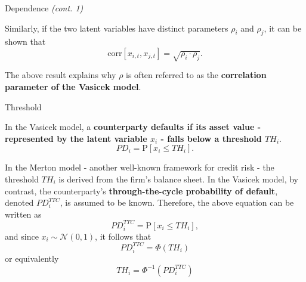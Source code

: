 \documentclass{beamer}
\begin{document}
\begin{frame}{Dependence \textit{(cont. 1)}}
\justifying
\small

Similarly, if the two latent variables have distinct parameters $\rho_i$ and $\rho_j$, it can be shown that
\begin{equation*}
\mathrm{corr}[x_{i,t}, x_{j,t}] = \sqrt{\rho_i \cdot \rho_j}.
\end{equation*}

\medskip

The above result explains why $\rho$ is often referred to as the \textbf{correlation parameter of the Vasicek model}.
\end{frame}

\begin{frame}{Threshold}
\justifying
\small

In the Vasicek model, a \textbf{counterparty defaults if its asset value - represented by the latent variable $x_i$ - falls below a threshold $TH_i$}.
\begin{equation*}
PD_i = \mathrm{P}[x_i \le TH_i].
\end{equation*}

\medskip

In the Merton model - another well-known framework for credit risk - the threshold $TH_i$ is derived from the firm's balance sheet. 
In the Vasicek model, by contrast, the counterparty's \textbf{through-the-cycle probability of default}, denoted $PD_i^{TTC}$, is assumed to be known. Therefore, the above equation can be written as
\begin{equation}
PD_i^{TTC} = \mathrm{P}[x_i \le TH_i],
\end{equation}
and since $x_i \sim \mathcal{N}(0,1)$, it follows that
\begin{equation*}
PD_i^{TTC} = \Phi(TH_i)
\end{equation*}
or equivalently
\begin{equation}
TH_i = \Phi^{-1}(PD_i^{TTC})
\end{equation}

\end{frame}
\end{document}
